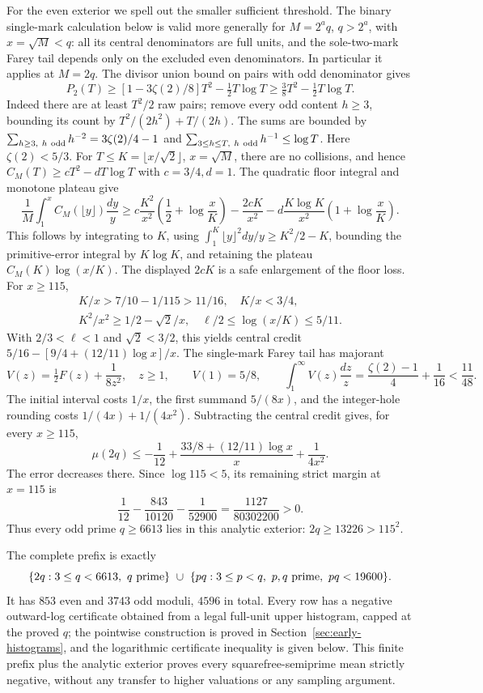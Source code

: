 \documentclass[11pt]{article}
\theoremstyle{definition}\newtheorem{definition}[theorem]{Definition}
\theoremstyle{remark}\newtheorem{remark}[theorem]{Remark}
\begin{document}
For the even exterior we spell out the smaller sufficient threshold.
The binary single-mark calculation below is valid more generally for
\(M=2^a q\), \(q>2^a\), with \(x=\sqrt M<q\): all its central
denominators are full units, and the sole-two-mark Farey tail depends
only on the excluded even denominators. In particular it applies at
\(M=2q\). The divisor union bound on pairs with odd denominator gives
\[
 P_2(T)\ge
 [1-3\zeta(2)/8]T^2-\tfrac12T\log T
 \ge\tfrac38T^2-\tfrac12T\log T.
\]
Indeed there are at least \(T^2/2\) raw pairs; remove every odd
content \(h\ge3\), bounding its count by
\(T^2/(2h^2)+T/(2h)\).
The sums are bounded by
\(\sum_{h\ge3,\ h\ {\rm odd}}h^{-2}=3\zeta(2)/4-1\) and
\(\sum_{3\le h\le T,\ h\ {\rm odd}}h^{-1}\le\log T\).
Here \(\zeta(2)<5/3\).
For \(T\le K=\lfloor x/\sqrt2\rfloor\), \(x=\sqrt M\), there are no
collisions, and hence \(C_M(T)\ge cT^2-dT\log T\) with \(c=3/4,d=1\).
The quadratic floor integral and monotone plateau give
\[
 \frac1M\int_1^x C_M(\lfloor y\rfloor)\frac{dy}{y}
 \ge c\frac{K^2}{x^2}\left(\frac12+\log\frac{x}{K}\right)
 -\frac{2cK}{x^2}
 -d\frac{K\log K}{x^2}\left(1+\log\frac{x}{K}\right).
\]
This follows by integrating to \(K\), using
\(\int_1^K\lfloor y\rfloor^2dy/y\ge K^2/2-K\), bounding the
primitive-error integral by \(K\log K\), and retaining the plateau
\(C_M(K)\log(x/K)\).  The displayed \(2cK\) is a safe enlargement
of the floor loss.
For \(x\ge115\),
\[
 \begin{gathered}
 K/x>7/10-1/115>11/16,\quad K/x<3/4,\\
 K^2/x^2\ge1/2-\sqrt2/x,\quad
 \ell/2\le\log(x/K)\le5/11 .
 \end{gathered}
\]
With \(2/3<\ell<1\) and \(\sqrt2<3/2\), this yields central credit
\(5/16-[9/4+(12/11)\log x]/x\).
The single-mark Farey tail has majorant
\[
 V(z)=\tfrac12F(z)+\frac1{8z^2},\quad z\ge1,\qquad
 V(1)=5/8,\qquad
 \int_1^\infty V(z)\frac{dz}{z}
 =\frac{\zeta(2)-1}{4}+\frac1{16}<\frac{11}{48}.
\]
The initial interval costs \(1/x\), the first summand \(5/(8x)\),
and the integer-hole rounding costs \(1/(4x)+1/(4x^2)\).
Subtracting the central credit gives, for every \(x\ge115\),
\[
 \mu(2q)\le-\frac1{12}
 +\frac{33/8+(12/11)\log x}{x}+\frac1{4x^2}.
\]
The error decreases there.  Since \(\log115<5\), its remaining
strict margin at \(x=115\) is
\[
 \frac1{12}-\frac{843}{10120}-\frac1{52900}
       =\frac{1127}{80302200}>0 .
\]
Thus every odd prime \(q\ge6613\) lies in this analytic exterior:
\(2q\ge13226>115^2\).

The complete prefix is exactly
\[
 \{2q:3\le q<6613,\ q\ {\rm prime}\}
 \ \cup\
 \{pq:3\le p<q,\ p,q\ {\rm prime},\ pq<19600\}.
\]
It has \(853\) even and \(3743\) odd moduli, \(4596\) in total.
Every row has a negative outward-log certificate obtained from a
legal full-unit upper histogram, capped at the proved \(q\);
the pointwise construction is proved in Section~\ref{sec:early-histograms},
and the logarithmic certificate inequality is given below.
This finite prefix plus the analytic exterior proves every
squarefree-semiprime mean strictly negative, without any
transfer to higher valuations or any sampling argument.
\end{document}
